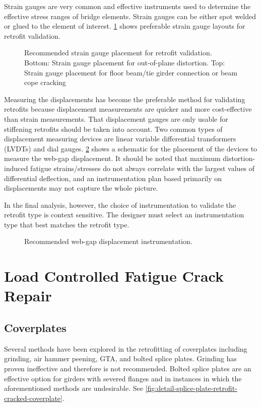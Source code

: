 Strain gauges are very common and effective instruments used to determine the effective stress ranges of bridge elements. Strain gauges can be either spot welded or glued to the element of interest. \cref{fig:recommended-strain-gauge-placement} shows preferable strain gauge layouts for retrofit validation.

\begin{figure}
  \caption{Recommended strain gauge placement for retrofit validation. Bottom: Strain gauge placement for out-of-plane distortion. Top: Strain gauge placement for floor beam/tie girder connection or beam cope cracking}
  \label{fig:recommended-strain-gauge-placement}
\end{figure}

Measuring the displacements has become the preferable method for validating retrofits because displacement
measurements are quicker and more cost-effective than strain measurements. That displacement gauges are only
usable for stiffening retrofits should be taken into account. Two common types of displacement measuring devices
are linear variable differential transformers (LVDTs) and dial gauges. \cref{fig:web-gap-displacement-instrumentation} shows a schematic for the
placement of the devices to measure the web-gap displacement. It should be noted that maximum distortion-induced
fatigue strains/stresses do not always correlate with the largest values of differential deflection, and an
instrumentation plan based primarily on displacements may not capture the whole picture.

In the final analysis, however, the choice of instrumentation to validate the retrofit type is context sensitive. The
designer must select an instrumentation type that best matches the retrofit type.

\begin{figure}
  \caption{Recommended web-gap displacement instrumentation.}
  \label{fig:web-gap-displacement-instrumentation}
\end{figure}

\section{Load Controlled Fatigue Crack Repair}

\subsection{Coverplates}
Several methods have been explored in the retrofitting of coverplates including grinding, air hammer peening,
GTA, and bolted splice plates. Grinding has proven ineffective and therefore is not recommended. Bolted splice
plates are an effective option for girders with severed flanges and in instances in which the aforementioned methods
are undesirable. See \cref{fig:detail-splice-plate-retrofit-cracked-coverplate}.

